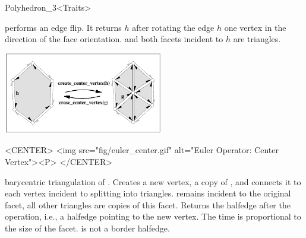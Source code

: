 \begin{ccRefClass}{Polyhedron_3<Traits>}

   {performs an edge flip. It returns $h$ after rotating the edge $h$ one
    vertex in the direction of the face orientation. 
    \ccPrecond {} and both  facets incident
    to $h$ are triangles.}

\begin{ccTexOnly}
    \begin{center}
      \parbox{0.52\textwidth}{%
       \includegraphics[width=0.52\textwidth]{Polyhedron_ref/fig/euler_center}%
      }
    \end{center}
\end{ccTexOnly}

\begin{ccHtmlOnly}
    <CENTER>
    <img src="fig/euler_center.gif" alt="Euler Operator: Center Vertex"><P>
    </CENTER>
\end{ccHtmlOnly}

    {barycentric triangulation of . Creates a new vertex,
     a copy of , and connects it to each vertex incident 
     to  splitting  into triangles. 
      remains incident to the original facet, all other triangles 
     are copies of this facet. Returns the halfedge 
     after the operation, i.e., a halfedge pointing to the new vertex.
     The time is proportional to the size of the facet.
     \ccPrecond {} is not a border halfedge.}


\end{ccRefClass}
